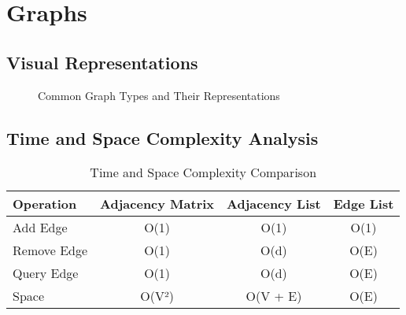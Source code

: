 
\chapter{Graphs}
\label{chapter:graphs}

\section*{Visual Representations}
\begin{figure}[h]
    \centering
    \caption{Common Graph Types and Their Representations}
    \label{fig:graph_types}
\end{figure}

\section*{Time and Space Complexity Analysis}
\begin{table}[h]
    \centering
    \begin{tabular}{|l|c|c|c|}
        \hline
        \textbf{Operation} & \textbf{Adjacency Matrix} & \textbf{Adjacency List} & \textbf{Edge List} \\
        \hline
        Add Edge & O(1) & O(1) & O(1) \\
        Remove Edge & O(1) & O(d) & O(E) \\
        Query Edge & O(1) & O(d) & O(E) \\
        Space & O(V²) & O(V + E) & O(E) \\
        \hline
    \end{tabular}
    \caption{Time and Space Complexity Comparison}
    \label{table:complexity}
\end{table}

